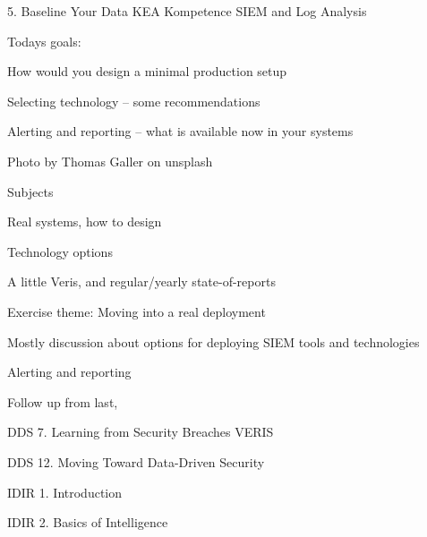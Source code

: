 \documentclass[Screen16to9,17pt]{foils}
\begin{document}
\mytitlepage
{5. Baseline Your Data}
{KEA Kompetence SIEM and Log Analysis}




Todays goals:
\begin{list2}
\item How would you design a minimal production setup
\item Selecting technology -- some recommendations
\item Alerting and reporting -- what is available now in your systems
\end{list2}

  Photo by Thomas Galler on unsplash


\begin{list1}
\item Subjects
\begin{list2}
\item Real systems, how to design
\item Technology options
\item A little Veris, and regular/yearly state-of-reports
\end{list2}
\item Exercise theme: Moving into a real deployment
\begin{list2}
\item Mostly discussion about options for deploying SIEM tools and technologies
\item Alerting and reporting
\end{list2}
\end{list1}

Follow up from last, 


\begin{list1}
\item DDS 7. Learning from Security Breaches VERIS
\item DDS 12. Moving Toward Data-Driven Security
\item IDIR 1. Introduction
\item IDIR 2. Basics of Intelligence
\end{list1}




\begin{quote}

\end{quote}
\end{document}
